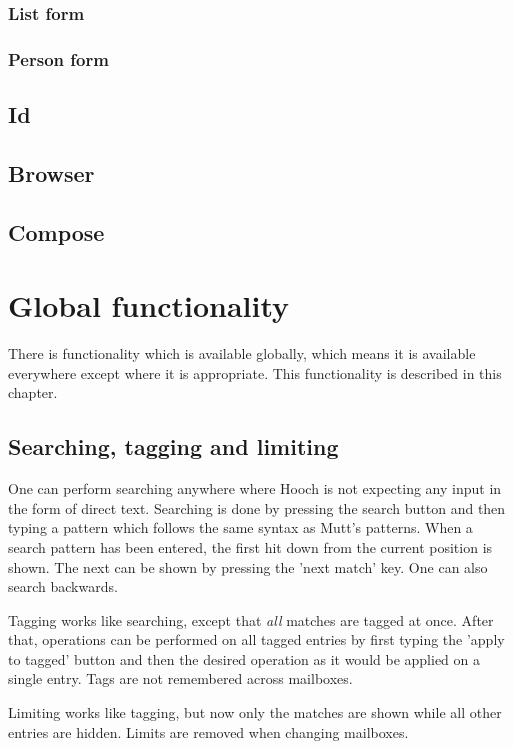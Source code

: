 \documentclass[a4paper]{book}
\begin{document}
\subsection{List form}

\subsection{Person form}


\section{Id}


\section{Browser}


\section{Compose}


\chapter{Global functionality}

There is functionality which is available globally, which means it is
available everywhere except where it is appropriate. This functionality is
described in this chapter.

\section{Searching, tagging and limiting}

One can perform searching anywhere where Hooch is not expecting any input
in the form of direct text.
Searching is done by pressing the search button and then typing a
pattern which follows the same syntax as Mutt's patterns.
When a search pattern has been entered, the first hit down from the current
position is shown. The next can be shown by pressing the 'next match' key.
One can also search backwards.

Tagging works like searching, except that \emph{all} matches are tagged at
once. After that, operations can be performed on all tagged
entries by first typing the 'apply to tagged' button and then the desired
operation as it would be applied on a single entry. Tags are not remembered
across mailboxes.

Limiting works like tagging, but now only the matches are shown while all
other entries are hidden. Limits are removed when changing mailboxes.
\end{document}
